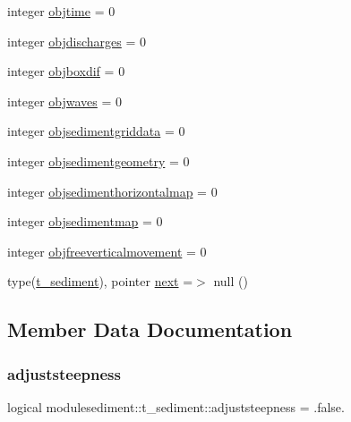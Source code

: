 \begin{DoxyCompactItemize}
\item 
integer \mbox{\hyperlink{structmodulesediment_1_1t__sediment_ab2b250a49894ad14b104b10660d86fe4}{objtime}} = 0
\item 
integer \mbox{\hyperlink{structmodulesediment_1_1t__sediment_a5cf6a9f3d9a5314b0157420d83b227f3}{objdischarges}} = 0
\item 
integer \mbox{\hyperlink{structmodulesediment_1_1t__sediment_ab42adb39995ef8a50009344f60d71468}{objboxdif}} = 0
\item 
integer \mbox{\hyperlink{structmodulesediment_1_1t__sediment_a43c19a6142fdac79f2d92f53ed153eb2}{objwaves}} = 0
\item 
integer \mbox{\hyperlink{structmodulesediment_1_1t__sediment_aa519353f751d12a78f2ef55b9636a091}{objsedimentgriddata}} = 0
\item 
integer \mbox{\hyperlink{structmodulesediment_1_1t__sediment_ada199bf0e6fbd735bc0f07a8a4ab9094}{objsedimentgeometry}} = 0
\item 
integer \mbox{\hyperlink{structmodulesediment_1_1t__sediment_aa99ceccf5bcc5396da984e7a0dbfb265}{objsedimenthorizontalmap}} = 0
\item 
integer \mbox{\hyperlink{structmodulesediment_1_1t__sediment_a0f2913a845fd21eaf21b219041e12adb}{objsedimentmap}} = 0
\item 
integer \mbox{\hyperlink{structmodulesediment_1_1t__sediment_a5a359a809a0cfb2a1a29b6d6b01f0bcb}{objfreeverticalmovement}} = 0
\item 
type(\mbox{\hyperlink{structmodulesediment_1_1t__sediment}{t\+\_\+sediment}}), pointer \mbox{\hyperlink{structmodulesediment_1_1t__sediment_a023a3464052571ba53b7638d7057482b}{next}} =$>$ null ()
\end{DoxyCompactItemize}


\subsection{Member Data Documentation}
\mbox{\label{structmodulesediment_1_1t__sediment_ab9347b7061103cbfcc29d2f2623ba442}} 
\subsubsection{\texorpdfstring{adjuststeepness}{adjuststeepness}}
{\footnotesize\ttfamily logical modulesediment\+::t\+\_\+sediment\+::adjuststeepness = .false.\hspace{0.3cm}{\ttfamily [private]}}

